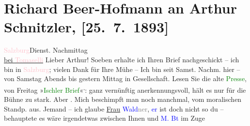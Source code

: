 

               \section[Richard Beer-Hofmann an Arthur Schnitzler, {[}25. 7. 1893{]}]{ Richard Beer-Hofmann an Arthur Schnitzler, {[}25. 7. 1893{]}}\nopagebreak{}\rehead{ }\normalsize\beginnumbering{} \toendnotes[C]{\smallbreak\pagebreak[2]} 
\toendnotes[C]{\smallbreak}\pstart
           \raggedleft{}{\pb}\textcolor{pink}{Salzburg}{}\ledrightnote{\textcolor{pink}{Salzburg}}{ }Dienst.{ }Nachmittag{\\}\uline{bei \textcolor{pink}{Tomaselli}{}\ledrightnote{\textcolor{pink}{Café Tomaselli}}}\pend
           \pstart
           Lieber Arthur! Soeben erhalte ich Ihren Brief nachgeschickt – ich
               bin in \textcolor{pink}{Salzburg}{}\ledrightnote{\textcolor{pink}{Salzburg}}; vielen Dank für Ihre Mühe – Ich bin
               seit Samst.{ }Nachm. hier – von Samstag{ }Abends bis gestern{ }Mittag in Gesellschaft. Lesen Sie die alte \textcolor{green}{Presse}{}\ledrightnote{\textcolor{green}{Die Presse}}, von Freitag »\textcolor{green}{Ischler
                  Brief}{}\ledrightnote{\textcolor{green}{Aus Ischl}}«\substVorne{}\textsuperscript{,}\substDazwischen{}:\substHinten{} ganz vernünftig {\pb}anerkennungsvoll, hält es nur für die Bühne zu stark. Aber . Mich beschimpft man noch manchmal, vom moralischen
               Standp. aus.\pend
           \pstart
           Jemand – ich glaube \uline{Frau}{ }\textcolor{blue}{Wald\textcolor{gray}{ner}}{}\ledrightnote{\textcolor{blue}{Waldner}}, \textcolor{blue}{er}{} ist doch nicht so
                  du{\geminationm} – behauptete es wäre irgendetwas zwischen Ihnen
               und \textcolor{blue}{M. B{\dotssix}t}{}\ledrightnote{\textcolor{blue}{Hermine von Schaffgotsch}} im Zuge
